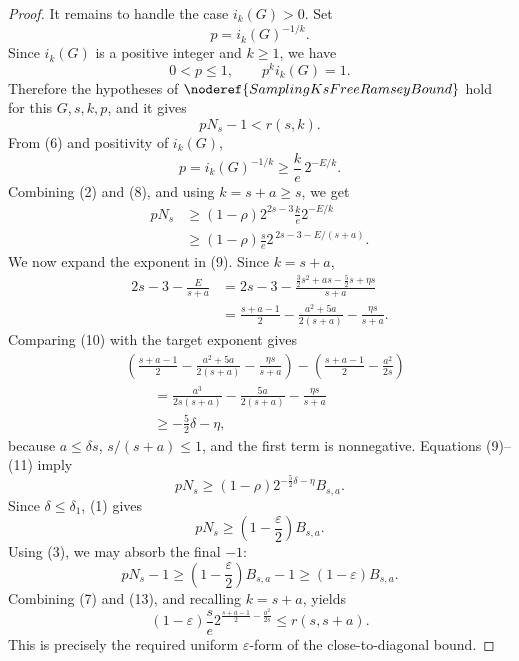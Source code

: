 \begin{proof}
It remains to handle the case \(i_k(G)>0\). Set
\[
  p=i_k(G)^{-1/k}.
\]
Since \(i_k(G)\) is a positive integer and \(k\ge1\), we have
\[
  0<p\le1,\qquad p^k i_k(G)=1.
\]
Therefore the hypotheses of \(\noderef{SamplingKsFreeRamseyBound}\) hold
for this \(G,s,k,p\), and it gives
\[
  pN_s-1<r(s,k). \tag{7}
\]
From (6) and positivity of \(i_k(G)\),
\[
  p=i_k(G)^{-1/k}\ge
  \frac{k}{e}\,2^{-E/k}. \tag{8}
\]
Combining (2) and (8), and using \(k=s+a\ge s\), we get
\[
\begin{aligned}
  pN_s
  &\ge
  (1-\rho)2^{2s-3}\frac{k}{e}2^{-E/k}  \\
  &\ge
  (1-\rho)\frac{s}{e}
  2^{\,2s-3-E/(s+a)}. \tag{9}
\end{aligned}
\]
We now expand the exponent in (9). Since \(k=s+a\),
\[
\begin{aligned}
  2s-3-\frac{E}{s+a}
  &=
  2s-3
  -\frac{\frac32s^2+as-\frac52s+\eta s}{s+a} \\
  &=
  \frac{s+a-1}{2}
  -\frac{a^2+5a}{2(s+a)}
  -\frac{\eta s}{s+a}. \tag{10}
\end{aligned}
\]
Comparing (10) with the target exponent gives
\[
\begin{aligned}
  &\left(\frac{s+a-1}{2}
  -\frac{a^2+5a}{2(s+a)}
  -\frac{\eta s}{s+a}\right)
  -
  \left(\frac{s+a-1}{2}-\frac{a^2}{2s}\right) \\
  &\qquad =
  \frac{a^3}{2s(s+a)}
  -\frac{5a}{2(s+a)}
  -\frac{\eta s}{s+a} \\
  &\qquad \ge
  -\frac{5}{2}\delta-\eta,
\end{aligned} \tag{11}
\]
because \(a\le\delta s\), \(s/(s+a)\le1\), and the first term is
nonnegative. Equations (9)--(11) imply
\[
  pN_s\ge
  (1-\rho)2^{-\frac52\delta-\eta}B_{s,a}.
\]
Since \(\delta\le\delta_1\), (1) gives
\[
  pN_s\ge \left(1-\frac{\varepsilon}{2}\right)B_{s,a}. \tag{12}
\]
Using (3), we may absorb the final \(-1\):
\[
  pN_s-1
  \ge
  \left(1-\frac{\varepsilon}{2}\right)B_{s,a}-1
  \ge
  (1-\varepsilon)B_{s,a}. \tag{13}
\]
Combining (7) and (13), and recalling \(k=s+a\), yields
\[
  (1-\varepsilon)\frac{s}{e}
  2^{\frac{s+a-1}{2}-\frac{a^2}{2s}}
  \le r(s,s+a).
\]
This is precisely the required uniform \(\varepsilon\)-form of the
close-to-diagonal bound.
\end{proof}
